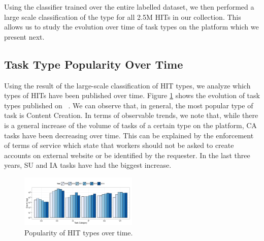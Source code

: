 Using the classifier trained over the entire labelled dataset, we then performed a large scale classification of the type for all 2.5M HITs in our collection. This allows us to study the evolution over time of task types on the \amt{} platform which we present next.

\subsection{Task Type Popularity Over Time}
Using the result of the large-scale classification of HIT types, we  analyze which  types of HITs have been published over time.
Figure \ref{fig:cat_trends} shows the evolution of task types published on \amt{}\ .
% 
We can observe that, in general, the most popular type of task is Content Creation.
% 
In terms of observable trends, we note that, while there is a general increase of the volume of tasks of a certain type on the platform,  CA tasks have been decreasing over time. This can be explained  by the enforcement of \amt{} terms of service which state that workers should not be asked to create accounts on external website or be identified by the requester.
% 
In the last three years, SU and IA tasks have had the biggest increase.

\begin{figure}[htbp]
	\centering
		\includegraphics[width=0.5\textwidth]{figures/category_trends}
	\caption{Popularity of HIT types over time.}
	\label{fig:cat_trends}
\end{figure}

